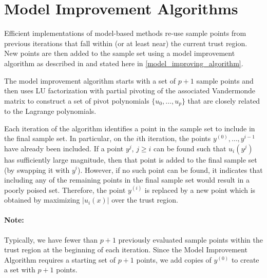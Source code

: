 




\section{Model Improvement Algorithms}

Efficient implementations of model-based methods re-use sample points from previous iterations that fall within (or at least near) the current trust region.
New points are then added to the sample set using a model improvement algorithm as described in 
\cite{introduction_book}  and stated here in \cref{model_improving_algorithm}.

The model improvement algorithm starts with a set of $p+1$ sample points and then uses LU factorization with partial pivoting of the 
associated Vandermonde matrix to construct a set of pivot polynomials $\{u_0, \ldots, u_p\}$ that are closely related to the Lagrange polynomials.  

Each iteration of the algorithm identifies a point in the sample set to include in the final sample set.
In particular, on the $i$th iteration, the points $y^{(0)}, \ldots, y^{i-1}$ have already been included.
If a point $y^j$, $j \ge i$ can be found such that $u_i(y^j)$ has sufficiently large magnitude, 
then that point is added to the final sample set (by swapping it with $y^{i}$).
However, if no such point can be found, it indicates that including any of the remaining points in the final sample set would result in a poorly poised set.
Therefore, the point $y^{(i)}$ is replaced by a new point which is obtained by maximizing $|u_i(x)|$ over the trust region.

\paragraph*{Note:}  Typically, we have fewer than $p+1$ previously evaluated sample points within the trust region at the beginning of each iteration.  Since the Model Improvement Algorithm requires a starting set of $p+1$ points, we add copies of $y^{(0)}$ to create a set with $p+1$ points.

